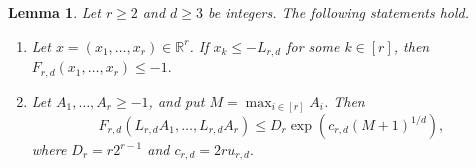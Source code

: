 \documentclass[twoside,12pt]{article}
\newtheorem{lemma}[theorem]{Lemma}
\theoremstyle{definition}
\theoremstyle{remark}
\newcommand{\R}{\mathbb R}
\newcommand{\1}{\mathbf 1}
\begin{document}
\begin{lemma}\label{lem:separator-bounds}
Let $r\ge2$ and $d\ge3$ be integers. The following statements hold.
\begin{enumerate}[label=\textup{(\roman*)}]
\item Let $x=(x_1,\ldots,x_r)\in\R^r$. If $x_k\le-L_{r,d}$ for some
$k\in[r]$, then
$F_{r,d}(x_1,\ldots,x_r)\le-1.$

\item Let $A_1,\ldots,A_r\ge-1$, and put
$M=\max_{i\in[r]}A_i$. Then
\begin{equation}\label{eq:separator-growth}
 F_{r,d}(L_{r,d}A_1,\ldots,L_{r,d}A_r)
 \le D_r\exp\!\left(c_{r,d}(M+1)^{1/d}\right),
\end{equation}
where
$
 D_r=r2^{r-1}$ and $
 c_{r,d}=2ru_{r,d}.
$
\end{enumerate}
\end{lemma}
\end{document}
